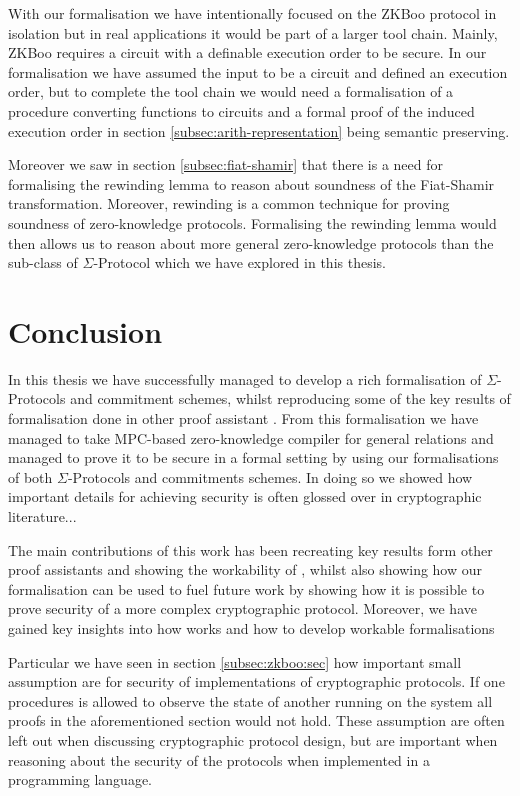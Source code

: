 With our formalisation we have intentionally focused on the ZKBoo protocol in
isolation but in real applications it would be part of a larger tool chain.
Mainly, ZKBoo requires a circuit with a definable execution order to be secure.
In our formalisation we have assumed the input to be a circuit and defined an
execution order, but to complete the tool chain we would need a formalisation of
a procedure converting functions to circuits and a formal proof of the induced
execution order in section \ref{subsec:arith-representation} being semantic preserving.

Moreover we saw in section \ref{subsec:fiat-shamir} that there is a need for
formalising the rewinding lemma to reason about soundness of the Fiat-Shamir
transformation. Moreover, rewinding is a common technique for proving soundness
of zero-knowledge protocols. Formalising the rewinding lemma would then allows
us to reason about more general zero-knowledge protocols than the sub-class of
$\Sigma$-Protocol which we have explored in this thesis.

\section{Conclusion}
\label{sec:conclusion}

In this thesis we have successfully managed to develop a rich formalisation of
$\Sigma$-Protocols and commitment schemes, whilst reproducing some of the key results of
formalisation done in other proof assistant \cite{cryptoeprint:2019:1185,certicrypt_sigma}.
From this formalisation we have managed to take MPC-based zero-knowledge
compiler for general relations and managed to prove it to be secure in a formal
setting by using our formalisations of both $\Sigma$-Protocols and commitments
schemes. In doing so we showed how important details for achieving security is
often glossed over in cryptographic literature...

The main contributions of this work has been recreating key results form other
proof assistants and showing the workability of \easycrypt, whilst also showing
how our formalisation can be used to fuel future work by showing how it is
possible to prove security of a more complex cryptographic protocol.
Moreover, we have gained key insights into how \easycrypt works and how to
develop workable formalisations

Particular we have seen in section \ref{subsec:zkboo:sec} how important small
assumption are for security of implementations of cryptographic protocols. If
one procedures is allowed to observe the state of another running on the system
all proofs in the aforementioned section would not hold. These assumption are
often left out when discussing cryptographic protocol design, but are important
when reasoning about the security of the protocols when implemented in a
programming language.


